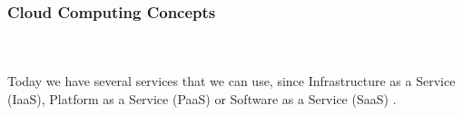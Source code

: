 







\subsubsection{Cloud Computing Concepts} 
\hfill \\ \\
Today we have several services that we can use, since Infrastructure as a Service (IaaS), Platform as a Service (PaaS) or Software as a Service (SaaS) \cite{Lenk2009}.

